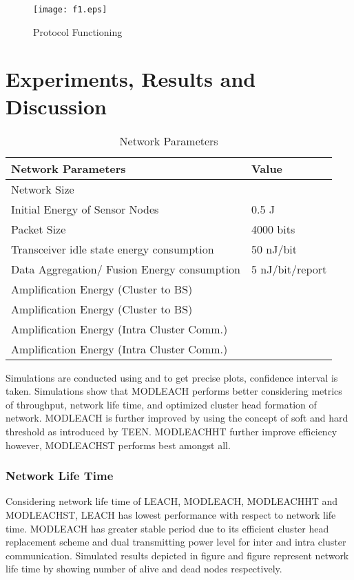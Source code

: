 \documentclass[10pt, conference, compsocconf]{IEEEtran}
\begin{document}
\begin{figure*}
\begin{center}
\texttt{[image: f1.eps]}
\caption{Protocol Functioning}
\end{center}
\end{figure*}
\section{Experiments, Results and Discussion}

\begin{table}
  \centering
 \caption{Network Parameters}
\begin{tabular}{p{6cm}| p{2.5cm}}
\hline{}
 \textbf{Network Parameters }              & \textbf{Value}	    \\
\hline{}
Network Size  	&   \\
Initial Energy of Sensor Nodes &	0.5 J\\
Packet Size	& 4000 bits \\
Transceiver idle state energy consumption	& 50 nJ/bit \\
Data Aggregation/ Fusion Energy consumption&	5 nJ/bit/report\\
Amplification Energy (Cluster to BS)	&  \\
Amplification Energy (Cluster to BS)  &	\\
Amplification Energy (Intra Cluster Comm.) 	& \\
Amplification Energy (Intra Cluster Comm.) &	\\




 \end{tabular}

\end{table}

Simulations are conducted using  and to get precise plots, confidence interval is taken. Simulations show that MODLEACH performs better considering metrics of throughput, network life time, and optimized cluster head formation of network. MODLEACH is further improved by using the concept of soft and hard threshold as introduced by TEEN. MODLEACHHT further improve efficiency however, MODLEACHST performs best amongst all.

\subsubsection{Network Life Time}

Considering network life time of LEACH, MODLEACH, MODLEACHHT and MODLEACHST, LEACH has lowest performance with respect to network life time. MODLEACH has greater stable period due to its efficient cluster head replacement scheme and dual transmitting power level for inter and intra cluster communication. Simulated results depicted in figure  and figure  represent network life time by showing number of alive and dead nodes respectively.
\end{document}
